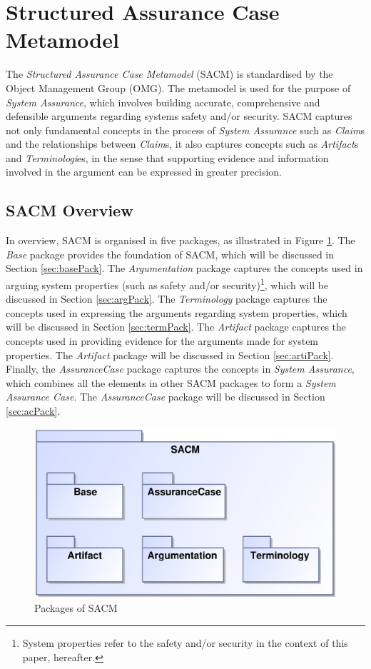 \section{Structured Assurance Case Metamodel}
\label{sec:sec2}
The \textit{Structured Assurance Case Metamodel} (SACM) is standardised by the Object Management Group (OMG). The metamodel is used for the purpose of \textit{System Assurance}, which involves building accurate, comprehensive and defensible arguments regarding systems safety and/or security. SACM captures not only fundamental concepts in the process of \textit{System Assurance} such as \textit{Claim}s and the relationships between \textit{Claim}s, it also captures concepts such as \textit{Artifact}s and \textit{Terminologi}es, in the sense that supporting evidence and information involved in the argument can be expressed in greater precision. 

\subsection{SACM Overview}
In overview, SACM is organised in five packages, as illustrated in Figure \ref{fig:overview}. The \textit{Base} package provides the foundation of SACM, which will be discussed in Section \ref{sec:basePack}. The \textit{Argumentation} package captures the concepts used in arguing system properties (such as safety and/or security)\footnote{System properties refer to the safety and/or security in the context of this paper, hereafter.}, which will be discussed in Section \ref{sec:argPack}. The \textit{Terminology} package captures the concepts used in expressing the arguments regarding system properties, which will be discussed in Section \ref{sec:termPack}. The \textit{Artifact} package captures the concepts used in providing evidence for the arguments made for system properties. The \textit{Artifact} package will be discussed in Section \ref{sec:artiPack}. Finally, the \textit{AssuranceCase} package captures the concepts in \textit{System Assurance}, which combines all the elements in other SACM packages to form a \textit{System Assurance Case}. The \textit{AssuranceCase} package will be discussed in Section \ref{sec:acPack}.
\begin{figure}
	\centering
	\includegraphics[width=0.6\linewidth]{fig/Overview.eps}
	\caption{Packages of SACM}
	\label{fig:overview}
\end{figure}

